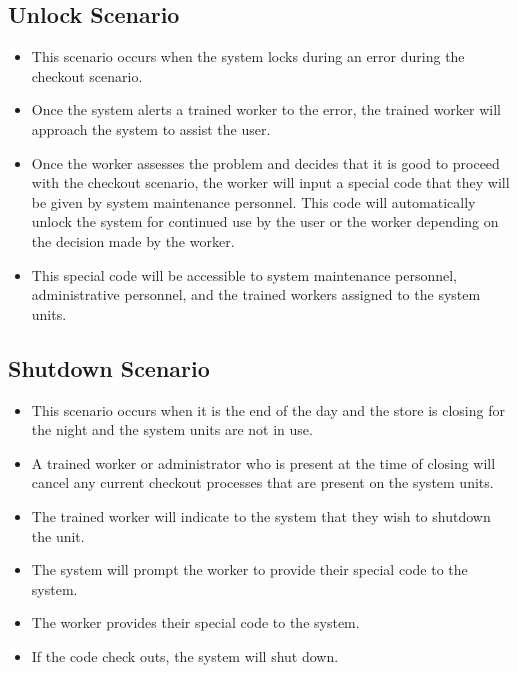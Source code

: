 \subsection{Unlock Scenario}
\begin{itemize}
    \item This scenario occurs when the system locks during an error during 
    the checkout scenario.
    \item Once the system alerts a trained worker to the error, the trained 
    worker will approach the system to assist the user.
    \item Once the worker assesses the problem and decides that it is good to 
    proceed with the checkout scenario, the worker will input a special code 
    that they will be given by system maintenance personnel. This code will 
    automatically unlock the system for continued use by the user or the worker 
    depending on the decision made by the worker.
    \item This special code will be accessible to system maintenance personnel, 
    administrative personnel, and the trained workers assigned to the 
    system units.
\end{itemize}

\subsection{Shutdown Scenario}
\begin{itemize}
    \item This scenario occurs when it is the end of the day and the store is 
    closing for the night and the system units are not in use.
    \item A trained worker or administrator who is present at the time of 
    closing will cancel any current checkout processes that are present on 
    the system units.
    \item The trained worker will indicate to the system that they wish to 
    shutdown the unit.
    \item The system will prompt the worker to provide their special 
    code to the system.
    \item The worker provides their special code to the system.
    \item If the code check outs, the system will shut down.
\end{itemize}

